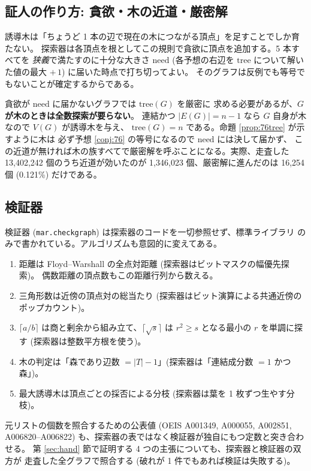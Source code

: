 \documentclass[paper=a4,fontsize=10.5pt,jafontsize=10.5pt]{jlreq}
\theoremstyle{plain}
\theoremstyle{definition}
\begin{document}
\subsection{証人の作り方: 貪欲・木の近道・厳密解}

誘導木は「ちょうど 1 本の辺で現在の木につながる頂点」を足すことでしか育たない。
探索器は各頂点を根としてこの規則で貪欲に頂点を追加する。5 本すべてを
\emph{狭義}で満たすのに十分な大きさ $\mathrm{need}$ (各予想の右辺を
$\mathrm{tree}$ について解いた値の最大 $+\,1$) に届いた時点で打ち切ってよい。
そのグラフは反例でも等号でもないことが確定するからである。

貪欲が $\mathrm{need}$ に届かないグラフでは $\mathrm{tree}(G)$ を厳密に
求める必要があるが、\textbf{$G$ が木のときは全数探索が要らない}。
連結かつ $|E(G)| = n - 1$ なら $G$ 自身が木なので $V(G)$ が誘導木を与え、
$\mathrm{tree}(G) = n$ である。命題 \ref{prop:76tree} が示すように木は
必ず予想 \ref{conj:76} の等号になるので $\mathrm{need}$ には決して届かず、
この近道が無ければ木の族すべてで厳密解を呼ぶことになる。実際、走査した
13,402,242 個のうち近道が効いたのが 1,346,023 個、厳密解に進んだのは
16,254 個 (0.121\%) だけである。

\subsection{検証器}

検証器 (\texttt{mar.checkgraph}) は探索器のコードを一切参照せず、標準ライブラリ
のみで書かれている。アルゴリズムも意図的に変えてある。

\begin{enumerate}
\item 距離は Floyd--Warshall の全点対距離 (探索器はビットマスクの幅優先探索)。
      偶数距離の頂点数もこの距離行列から数える。
\item 三角形数は近傍の頂点対の総当たり (探索器はビット演算による共通近傍の
      ポップカウント)。
\item $\lceil a/b \rceil$ は商と剰余から組み立て、$\lceil \sqrt{s} \rceil$ は
      $r^2 \ge s$ となる最小の $r$ を単調に探す (探索器は整数平方根を使う)。
\item 木の判定は「森であり辺数 $= |T| - 1$」(探索器は「連結成分数 $= 1$ かつ森」)。
\item 最大誘導木は頂点ごとの採否による分枝 (探索器は葉を 1 枚ずつ生やす分枝)。
\end{enumerate}

元リストの個数を照合するための公表値 (OEIS A001349, A000055, A002851,
A006820--A006822) も、探索器の表ではなく検証器が独自にもつ定数と突き合わせる。
第 \ref{sec:hand} 節で証明する 4 つの主張についても、探索器と検証器の双方が
走査した全グラフで照合する (破れが 1 件でもあれば検証は失敗する)。
\end{document}
